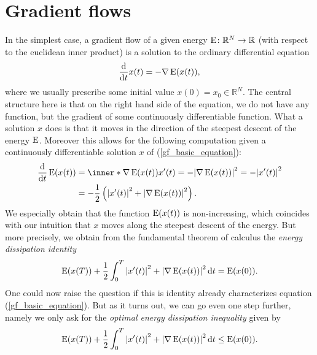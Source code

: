 \section{Gradient flows}
	\label{section_gradient_flows}
In the simplest case, a gradient flow of a given energy $ \operatorname{E} \colon \mathbb{ R }^{ N } \to \mathbb{ R } $ (with respect to the euclidean inner product) is a solution to the ordinary differential equation
\begin{equation}
	\label{gf_basic_equation}
	\dv{ t } x ( t ) = - \nabla \operatorname{E} ( x ( t ) ) ,
\end{equation}
where we usually prescribe some initial value $ x ( 0 ) = x_{ 0 } \in \mathbb{ 
R }^{ N } $. The central structure here is that on the right hand side of the 
equation, we do not have any function, but the gradient of some continuously 
differentiable function. What a solution $ x $ does is that it moves in the 
direction of the steepest descent of the energy $ \operatorname{E} $. Moreover this 
allows for the following computation given a continuously differentiable 
solution $ x $ of (\ref{gf_basic_equation}):
\begin{align*}
	\dv{ t } \energy ( x ( t ) ) 
	& =
	\inner*{ \nabla \energy ( x ( t ) ) }{ x ' ( t ) }
	=
	- \abs{ \nabla \energy ( x ( t ) ) }^{ 2 }
	=
	- \abs{ x' ( t ) }^{ 2 }
	\\
	& =
	- \frac{ 1 }{ 2 }
	\left(
		\abs{ x'( t ) }^{ 2 }
		+
		\abs{ \nabla \energy ( x ( t ) ) }^{ 2 }
	\right).
\end{align*}
We especially obtain that the function $ \operatorname{E} ( x ( t ) ) $ is 
non-increasing, which coincides with our intuition that $ x $ moves along the 
steepest descent of the energy. But more precisely, we obtain from the 
fundamental theorem of calculus the \emph{energy dissipation identity}
\begin{equation}
	\label{basic_energy_dissipation_identity}
	\operatorname{E} ( x ( T ) )
	+
	\frac{ 1 }{ 2 }
	\int_{ 0 }^{ T }
		\abs{ x' ( t ) }^{ 2 }
		+
		\abs{ \nabla \operatorname{E} ( x ( t ) ) }^{ 2 }
	\dd{ t }
	= 
	\operatorname{E} ( x ( 0 ) ).
\end{equation}
One could now raise the question if this is identity already characterizes 
equation (\ref{gf_basic_equation}). 
But as it turns out, we can go even one step further, namely we only ask for 
the 
\emph{optimal energy dissipation inequality} given by
\begin{equation}
	\label{basic_optimal_energy_dissipation_inequality}
	\operatorname{E} ( x ( T ) )
	+
	\frac{ 1 }{ 2 }
	\int_{ 0 }^{ T }
		\abs{ x' ( t ) }^{ 2 }
		+
		\abs{ \nabla \operatorname{E} ( x ( t ) ) }^{ 2 }
	\dd{ t }
	\leq
	\operatorname{E} ( x ( 0 ) ).
\end{equation}
